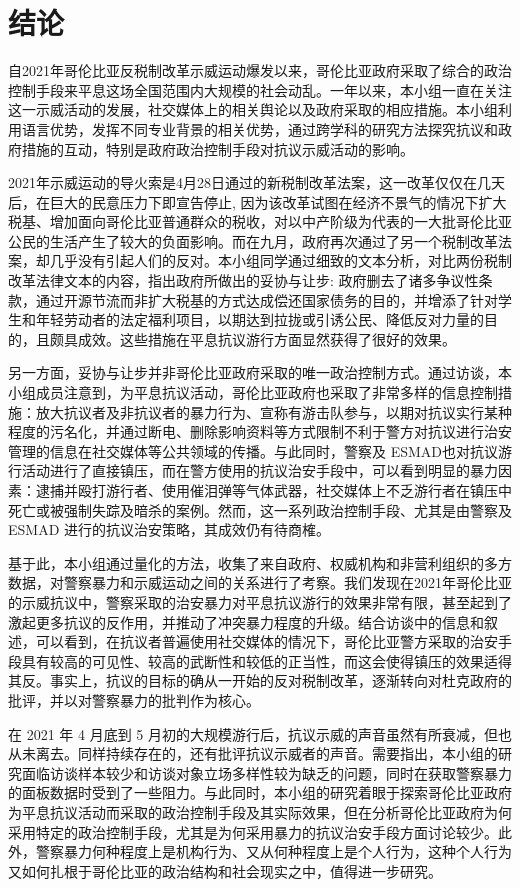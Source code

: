 \documentclass{phyasgn}\usepackage{nag}
\begin{document}
\section{结论}
自2021年哥伦比亚反税制改革示威运动爆发以来，哥伦比亚政府采取了综合的政治控制手段来平息这场全国范围内大规模的社会动乱。一年以来，本小组一直在关注这一示威活动的发展，社交媒体上的相关舆论以及政府采取的相应措施。本小组利用语言优势，发挥不同专业背景的相关优势，通过跨学科的研究方法探究抗议和政府措施的互动，特别是政府政治控制手段对抗议示威活动的影响。
\par 2021年示威运动的导火索是4月28日通过的新税制改革法案，这一改革仅仅在几天后，在巨大的民意压力下即宣告停止, 因为该改革试图在经济不景气的情况下扩大税基、增加面向哥伦比亚普通群众的税收，对以中产阶级为代表的一大批哥伦比亚公民的生活产生了较大的负面影响。而在九月，政府再次通过了另一个税制改革法案，却几乎没有引起人们的反对。本小组同学通过细致的文本分析，对比两份税制改革法律文本的内容，指出政府所做出的妥协与让步: 政府删去了诸多争议性条款，通过开源节流而非扩大税基的方式达成偿还国家债务的目的，并增添了针对学生和年轻劳动者的法定福利项目，以期达到拉拢或引诱公民、降低反对力量的目的，且颇具成效。这些措施在平息抗议游行方面显然获得了很好的效果。
\par 另一方面，妥协与让步并非哥伦比亚政府采取的唯一政治控制方式。通过访谈，本小组成员注意到，为平息抗议活动，哥伦比亚政府也采取了非常多样的信息控制措施：放大抗议者及非抗议者的暴力行为、宣称有游击队参与，以期对抗议实行某种程度的污名化，并通过断电、删除影响资料等方式限制不利于警方对抗议进行治安管理的信息在社交媒体等公共领域的传播。与此同时，警察及 ESMAD也对抗议游行活动进行了直接镇压，而在警方使用的抗议治安手段中，可以看到明显的暴力因素：逮捕并殴打游行者、使用催泪弹等气体武器，社交媒体上不乏游行者在镇压中死亡或被强制失踪及暗杀的案例。然而，这一系列政治控制手段、尤其是由警察及 ESMAD 进行的抗议治安策略，其成效仍有待商榷。
\par 基于此，本小组通过量化的方法，收集了来自政府、权威机构和非营利组织的多方数据，对警察暴力和示威运动之间的关系进行了考察。我们发现在2021年哥伦比亚的示威抗议中，警察采取的治安暴力对平息抗议游行的效果非常有限，甚至起到了激起更多抗议的反作用，并推动了冲突暴力程度的升级。结合访谈中的信息和叙述，可以看到，在抗议者普遍使用社交媒体的情况下，哥伦比亚警方采取的治安手段具有较高的可见性、较高的武断性和较低的正当性，而这会使得镇压的效果适得其反。事实上，抗议的目标的确从一开始的反对税制改革，逐渐转向对杜克政府的批评，并以对警察暴力的批判作为核心。
\par 在 2021 年 4 月底到 5 月初的大规模游行后，抗议示威的声音虽然有所衰减，但也从未离去。同样持续存在的，还有批评抗议示威者的声音。需要指出，本小组的研究面临访谈样本较少和访谈对象立场多样性较为缺乏的问题，同时在获取警察暴力的面板数据时受到了一些阻力。与此同时，本小组的研究着眼于探索哥伦比亚政府为平息抗议活动而采取的政治控制手段及其实际效果，但在分析哥伦比亚政府为何采用特定的政治控制手段，尤其是为何采用暴力的抗议治安手段方面讨论较少。此外，警察暴力何种程度上是机构行为、又从何种程度上是个人行为，这种个人行为又如何扎根于哥伦比亚的政治结构和社会现实之中，值得进一步研究。
\end{document}
